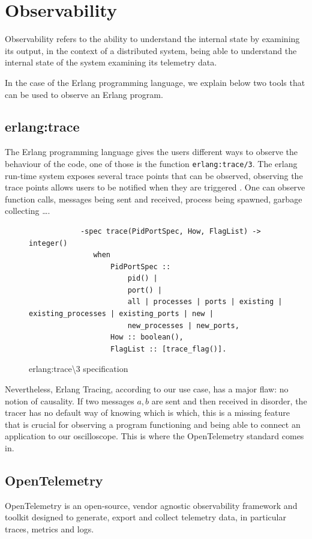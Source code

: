 \section{Observability}
        Observability refers to the ability to understand the internal state by examining its output, in the context of a distributed system, being able to understand the internal state of the system examining its telemetry data. \cite{otel-o}

    In the case of the Erlang programming language, we explain below two tools that can be used to observe an Erlang program.
    
    \subsection{erlang:trace}
        The Erlang programming language gives the users different ways to observe the behaviour of the code, one of those is the function \texttt{erlang:trace/3}. The erlang run-time system exposes several trace points that can be observed, observing the trace points allows users to be notified when they are triggered \cite{erl-t}. One can observe function calls, messages being sent and received, process being spawned, garbage collecting \dots. 
        \begin{figure}[!ht]
        \centering
        \begin{verbatim}
            -spec trace(PidPortSpec, How, FlagList) -> integer()
               when
                   PidPortSpec ::
                       pid() |
                       port() |
                       all | processes | ports | existing | existing_processes | existing_ports | new |
                       new_processes | new_ports,
                   How :: boolean(),
                   FlagList :: [trace_flag()].
        \end{verbatim}
        \caption{erlang:trace\textbackslash3 specification}
\end{figure}

    Nevertheless, Erlang Tracing, according to our use case, has a major flaw: no notion of causality. If two messages $a, b$ are sent and then received in disorder, the tracer has no default way of knowing which is which, this is a missing feature that is crucial for observing a program functioning and being able to connect an application to our oscilloscope.  This is where the OpenTelemetry standard comes in.

\subsection{OpenTelemetry}
    OpenTelemetry is an open-source, vendor agnostic observability framework and toolkit designed to generate, export and collect telemetry data, in particular traces, metrics and logs. \cite{otel-o} 

